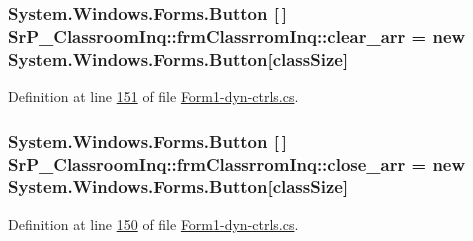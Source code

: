 \hypertarget{class_sr_p___classroom_inq_1_1frm_classrrom_inq_a1c427c3d5bb61c96ca798e5f6aaff8f4}{
\subsubsection[{clear\-\_\-arr}]{\setlength{\rightskip}{0pt plus 5cm}\-System.\-Windows.\-Forms.\-Button \mbox{[}$\,$\mbox{]} {\bf \-Sr\-P\-\_\-\-Classroom\-Inq\-::frm\-Classrrom\-Inq\-::clear\-\_\-arr} = new \-System.\-Windows.\-Forms.\-Button\mbox{[}{\bf class\-Size}\mbox{]}}}
\label{class_sr_p___classroom_inq_1_1frm_classrrom_inq_a1c427c3d5bb61c96ca798e5f6aaff8f4}


\-Definition at line \hyperlink{_form1-dyn-ctrls_8cs_source_l00151}{151} of file \hyperlink{_form1-dyn-ctrls_8cs_source}{\-Form1-\/dyn-\/ctrls.\-cs}.

\hypertarget{class_sr_p___classroom_inq_1_1frm_classrrom_inq_a4758f35d344b79b972e88a42cb660904}{
\subsubsection[{close\-\_\-arr}]{\setlength{\rightskip}{0pt plus 5cm}\-System.\-Windows.\-Forms.\-Button \mbox{[}$\,$\mbox{]} {\bf \-Sr\-P\-\_\-\-Classroom\-Inq\-::frm\-Classrrom\-Inq\-::close\-\_\-arr} = new \-System.\-Windows.\-Forms.\-Button\mbox{[}{\bf class\-Size}\mbox{]}}}
\label{class_sr_p___classroom_inq_1_1frm_classrrom_inq_a4758f35d344b79b972e88a42cb660904}


\-Definition at line \hyperlink{_form1-dyn-ctrls_8cs_source_l00150}{150} of file \hyperlink{_form1-dyn-ctrls_8cs_source}{\-Form1-\/dyn-\/ctrls.\-cs}.

